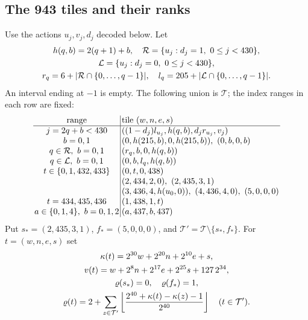 \subsection*{The 943 tiles and their ranks}
Use the actions $u_j,v_j,d_j$ decoded below. Let
\[
\begin{gathered}
h(q,b)=2(q+1)+b,\quad
\mathcal R=\{u_j:d_j=1,\ 0\le j<430\},\\
\mathcal L=\{u_j:d_j=0,\ 0\le j<430\},\\
r_q=6+|\mathcal R\cap\{0,\ldots,q-1\}|,\quad
l_q=205+|\mathcal L\cap\{0,\ldots,q-1\}|.
\end{gathered}
\]
An interval ending at $-1$ is empty. The following union is $\mathcal T$;
the index ranges in each row are fixed:
\[
\setlength{\arraycolsep}{1.4pt}\begin{array}{c|l}
\text{range}&\text{tile }(w,n,e,s)\\\hline
j=2q+b<430&((1-d_j)l_{u_j},h(q,b),d_jr_{u_j},v_j)\\
b=0,1&(0,h(215,b),0,h(215,b)),\ (0,b,0,b)\\
q\in\mathcal R,\ b=0,1&(r_q,b,0,h(q,b))\\
q\in\mathcal L,\ b=0,1&(0,b,l_q,h(q,b))\\
t\in\{0,1,432,433\}&(0,t,0,438)\\
&(2,434,2,0),\ (2,435,3,1)\\
&(3,436,4,h(u_0,0)),\ (4,436,4,0),\ (5,0,0,0)\\
t=434,435,436&(1,438,1,t)\\
a\in\{0,1,4\},\ b=0,1,2&(a,437,b,437)
\end{array}
\]
Put $s_*=(2,435,3,1)$, $f_*=(5,0,0,0)$, and $\mathcal T'=\mathcal T\setminus\{s_*,f_*\}$.
For $t=(w,n,e,s)$ set
\[
\begin{gathered}
\kappa(t)=2^{30}w+2^{20}n+2^{10}e+s,\\
v(t)=w+2^8n+2^{17}e+2^{25}s+127\,2^{34},\\
\varrho(s_*)=0,\quad\varrho(f_*)=1,\\
\varrho(t)=2+\sum_{z\in\mathcal T'}
 \left\lfloor\frac{2^{40}+\kappa(t)-\kappa(z)-1}{2^{40}}\right\rfloor
 \quad(t\in\mathcal T').
\end{gathered}
\]

